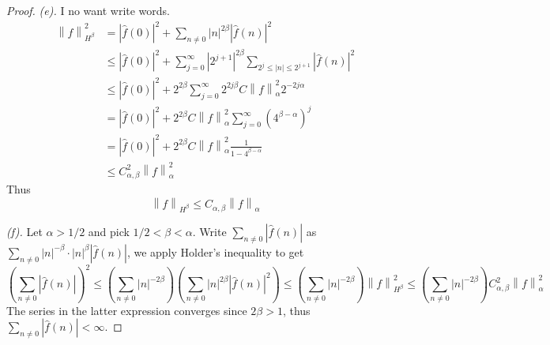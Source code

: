\documentclass{article}
\newcommand{\norm}[1]{\left\|#1\right\|}
\theoremstyle{definition} %
\numberwithin{thm}{section} %
\theoremstyle{definition} %
\begin{document}
\begin{proof}
\textit{(e).}
I no want write words.
\begin{align*}
    \norm{f}^2_{H^\beta}
    &= |\hat{f}(0)|^2 + \sum_{n \neq 0}|n|^{2\beta}|\hat{f}(n)|^2 \\
    &\leq |\hat{f}(0)|^2 + 
    \sum_{j = 0}^\infty |2^{j + 1}|^{2\beta} 
    \sum_{2^j \leq |n| \leq 2^{j + 1}} |\hat{f}(n)|^2 \\
    &\leq |\hat{f}(0)|^2 + 
    2^{2\beta}\sum_{j = 0}^\infty 2^{2j\beta}
    C\norm{f}^2_\alpha 2^{-2j\alpha} \\
    &= |\hat{f}(0)|^2 + 
    2^{2\beta}C\norm{f}^2_\alpha
    \sum_{j = 0}^\infty \left(4^{\beta - \alpha}\right)^j \\
    &= |\hat{f}(0)|^2 + 
    2^{2\beta}C\norm{f}^2_\alpha \frac{1}{1 - 4^{\beta - \alpha}} \\
    &\leq C^2_{\alpha, \beta}\norm{f}^2_\alpha
\end{align*}
Thus
\[
    \norm{f}_{H^\beta} \leq C_{\alpha, \beta}\norm{f}_\alpha
\]

\textit{(f).}
Let $\alpha > 1/2$ and pick $1/2 < \beta < \alpha$.
Write $\sum_{n \neq 0} |\hat{f}(n)|$ as $\sum_{n \neq 0} |n|^{-\beta} 
\cdot |n|^{\beta}|\hat{f}(n)|$, we apply Holder's inequality to get
\[
    \left(\sum_{n \neq 0} |\hat{f}(n)|\right)^2
    \leq \left(\sum_{n \neq 0} |n|^{-2\beta}\right)
    \left(\sum_{n \neq 0} |n|^{2\beta}|\hat{f}(n)|^2\right)
    \leq \left(\sum_{n \neq 0} |n|^{-2\beta}\right)\norm{f}_{H^\beta}^2
    \leq \left(\sum_{n \neq 0} |n|^{-2\beta}\right)
    C_{\alpha, \beta}^2\norm{f}^2_\alpha
\]
The series in the latter expression converges since $2\beta > 1$, thus
$\sum_{n \neq 0} |\hat{f}(n)| < \infty$.
\end{proof}
\end{document}

